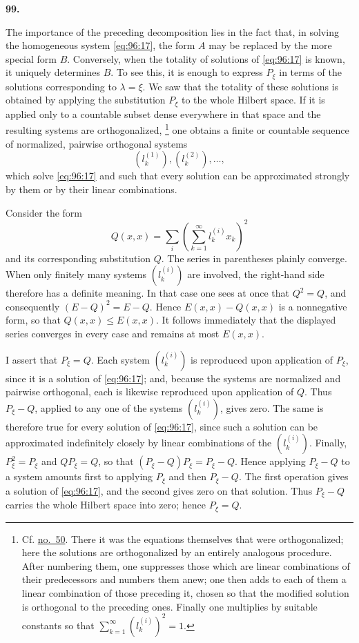 \documentclass[
  paper=b5,
  fontsize=13pt,
  twoside=true,
  open=any,
  bookmarkpackage=false,
  chapterprefix=true,
  headings=normal
]{scrbook}
\theoremstyle{definition}
\newcommand{\numberedparagraph}[1]{%
  \par\medskip\phantomsection\label{sec:#1}%
  \noindent\textbf{#1.}\enspace
}
\begin{document}
\numberedparagraph{99}
The importance of the preceding decomposition lies in the fact that, in
solving the homogeneous system \eqref{eq:96:17}, the form \(A\) may be
replaced by the more special form \(B\).  Conversely, when the totality of
solutions of \eqref{eq:96:17} is known, it uniquely determines \(B\).  To see
this, it is enough to express \(P_\xi\) in terms of the solutions corresponding
to \(\lambda=\xi\).  We saw that the totality of these solutions is obtained
by applying the substitution \(P_\xi\) to the whole Hilbert space.  If it is
applied only to a countable subset dense everywhere in that space and the
resulting systems are orthogonalized,
\footnote{Cf. \hyperref[sec:50]{no.~50}.  There it was the equations themselves
that were orthogonalized; here the solutions are orthogonalized by an entirely
analogous procedure.  After numbering them, one suppresses those which are
linear combinations of their predecessors and numbers them anew; one then
adds to each of them a linear combination of those preceding it, chosen so
that the modified solution is orthogonal to the preceding ones.  Finally one
multiplies by suitable constants so that
\(\sum_{k=1}^{\infty}(l_k^{(i)})^2=1\).}
one obtains a finite or countable sequence of normalized, pairwise orthogonal
systems
\[
  (l_k^{(1)}),(l_k^{(2)}),\ldots,
\]
which solve \eqref{eq:96:17} and such that every solution can be approximated
strongly by them or by their linear combinations.

Consider the form
\[
  Q(x,x)=\sum_i\left(\sum_{k=1}^{\infty}l_k^{(i)}x_k\right)^2
\]
and its corresponding substitution \(Q\).  The series in parentheses plainly
converge.  When only finitely many systems \((l_k^{(i)})\) are involved, the
right-hand side therefore has a definite meaning.  In that case one sees at
once that \(Q^2=Q\), and consequently \((E-Q)^2=E-Q\).  Hence
\(E(x,x)-Q(x,x)\) is a nonnegative form, so that \(Q(x,x)\le E(x,x)\).  It
follows immediately that the displayed series converges in every case and
remains at most \(E(x,x)\).

I assert that \(P_\xi=Q\).  Each system \((l_k^{(i)})\) is reproduced upon
application of \(P_\xi\), since it is a solution of \eqref{eq:96:17}; and,
because the systems are normalized and pairwise orthogonal, each is likewise
reproduced upon application of \(Q\).  Thus \(P_\xi-Q\), applied to any one of
the systems \((l_k^{(i)})\), gives zero.  The same is therefore true for every
solution of \eqref{eq:96:17}, since such a solution can be approximated
indefinitely closely by linear combinations of the \((l_k^{(i)})\).  Finally,
\(P_\xi^2=P_\xi\) and \(QP_\xi=Q\), so that
\((P_\xi-Q)P_\xi=P_\xi-Q\).  Hence applying \(P_\xi-Q\) to a system amounts
first to applying \(P_\xi\) and then \(P_\xi-Q\).  The first operation gives
a solution of \eqref{eq:96:17}, and the second gives zero on that solution.
Thus \(P_\xi-Q\) carries the whole Hilbert space into zero; hence
\(P_\xi=Q\).
\end{document}
